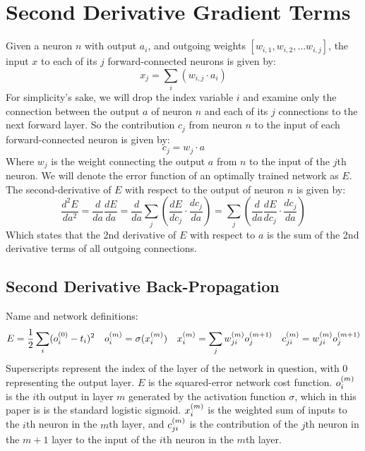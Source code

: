 \section{Second Derivative Gradient Terms}
Given a neuron $n$ with output $a_i$, and outgoing weights $\left[ w_{i,1}, w_{i,2}, \ldots w_{i,j} \right]$, the input $x$ to each of its $j$ forward-connected neurons is given by:
\begin{equation}
x_j = \sum_i\left(w_{i,j} \cdot a_i\right)
\end{equation}
For simplicity's sake, we will drop the index variable $i$ and examine only the connection between the output $a$ of neuron $n$ and each of its $j$ connections to the next forward layer. So the contribution $c_j$ from neuron $n$ to the input of each forward-connected neuron is given by:
\begin{equation}
c_j = w_j \cdot a
\end{equation} 
Where $w_j$ is the weight connecting the output $a$ from $n$ to the input of the $j$th neuron. We will denote the error function of an optimally trained network as $E$. The second-derivative of $E$ with respect to the output of neuron $n$ is given by: 
\begin{equation}
\frac{d^2E}{da^2} = \frac{d}{da}\frac{dE}{da} = \frac{d}{da}\sum_j\left(\frac{dE}{dc_j}\cdot\frac{dc_j}{da}\right) = \sum_j\left(\frac{d}{da}\frac{dE}{dc_j}\cdot\frac{dc_j}{da}\right)
\end{equation}
Which states that the 2nd derivative of $E$ with respect to $a$ is the sum of the 2nd derivative terms of all outgoing connections.  

\subsection{Second Derivative Back-Propagation}

Name and network definitions:\\[5pt]
\begin{align}
E &= \frac{1}{2}\sum\limits_i (o_{i}^{(0)} - t_{i})^2 &
o_{i}^{(m)} &= \sigma(x_{i}^{(m)}) &
x_{i}^{(m)} &= \sum\limits_j {w_{ji}^{(m)}}{ o_{j}^{(m + 1)}} &
c_{ji}^{(m)} = w_{ji}^{(m)} o_{j}^{(m+1)}
\end{align}
Superscripts represent the index of the layer of the network in question, with 0 representing the output layer. $E$ is the squared-error network cost function. $o_{i}^{(m)}$ is the $i$th output in layer $m$ generated by the activation function $\sigma$, which in this paper is is the standard logistic sigmoid. $x_{i}^{(m)}$ is the weighted sum of inputs to the $i$th neuron in the $m$th layer, and $c_{ji}^{(m)}$ is the contribution of the $j$th neuron in the $m+1$ layer to the input of the $i$th neuron in the $m$th layer. 